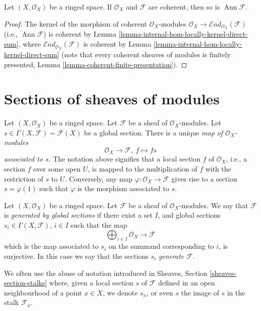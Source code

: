 \begin{lemma}
	Let $(X,\mathcal{O}_X)$ be a ringed space.
	If $\mathcal{O}_X$ and $\mathcal{F}$ are coherent,
	then so is $\operatorname{Ann}\mathcal{F}$.
\end{lemma}
\begin{proof}
	The kernel of the morphism of coherent $\mathcal{O}_X$-modules
	$\mathcal{O}_X\to
	\mathcal{E}nd_{\mathcal{O}_X}(\mathcal{F})$
	(i.e., $\operatorname{Ann}\mathcal{F}$) is coherent by Lemma
	\ref{lemma-internal-hom-locally-kernel-direct-sum}, where
	$\mathcal{E}nd_{\mathcal{O}_X}(\mathcal{F})$ is coherent by Lemma
	\ref{lemma-internal-hom-locally-kernel-direct-sum}
	(note that every coherent sheaves of modules is finitely presented,
	Lemma \ref{lemma-coherent-finite-presentation}).
\end{proof}

\section{Sections of sheaves of modules}
\label{section-sections}

\noindent
Let $(X, \mathcal{O}_X)$ be a ringed space.
Let $\mathcal{F}$ be a sheaf of $\mathcal{O}_X$-modules.
Let $s \in \Gamma(X, \mathcal{F}) = \mathcal{F}(X)$ be a
global section. There is a unique {\it map of $\mathcal{O}_X$-modules}
$$
\mathcal{O}_X \longrightarrow \mathcal{F}, \ f \longmapsto fs
$$
{\it associated to $s$}. The notation above signifies that a local
section $f$ of $\mathcal{O}_X$, i.e., a section $f$ over some open $U$,
is mapped to the multiplication of $f$ with the restriction of $s$ to
$U$. Conversely, any map $\varphi : \mathcal{O}_X \to \mathcal{F}$
gives rise to a section $s = \varphi(1)$ such that $\varphi$ is
the morphism associated to $s$.

\begin{definition}
\label{definition-globally-generated}
Let $(X, \mathcal{O}_X)$ be a ringed space.
Let $\mathcal{F}$ be a sheaf of $\mathcal{O}_X$-modules.
We say that $\mathcal{F}$ is {\it generated by global
sections} if there exist a set $I$, and
global sections $s_i \in \Gamma(X, \mathcal{F})$, $i \in I$
such that the map
$$
\bigoplus\nolimits_{i \in I}
\mathcal{O}_X \longrightarrow \mathcal{F}
$$
which is the map associated to $s_i$ on the summand corresponding to $i$,
is surjective. In this case we say that the sections $s_i$
{\it generate} $\mathcal{F}$.
\end{definition}

\noindent
We often use the abuse of notation introduced in
Sheaves, Section \ref{sheaves-section-stalks} where, given a local
section $s$ of $\mathcal{F}$ defined in an open neighbourhood
of a point $x \in X$, we denote $s_x$, or even $s$ the image of $s$
in the stalk $\mathcal{F}_x$.

